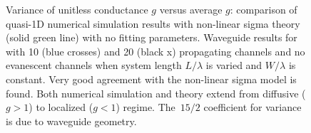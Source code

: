 \begin{figure}
\vskip -0.5cm
\centerline{
}
\vskip -0.5cm
\caption[Variance of unitless conductance $g$ versus average $g$: comparison of quasi-1D numerical simulation results with non-linear sigma theory~\cite{2000_Mirlin} (solid green line) with no fitting parameters.]{Variance of unitless conductance $g$ versus average $g$: comparison of quasi-1D numerical simulation results with non-linear sigma theory~\cite{2000_Mirlin} (solid green line) with no fitting parameters. Waveguide results for with 10 (blue crosses) and 20 (black x) propagating channels and no evanescent channels when system length $L/\lambda$ is varied and $W/\lambda$ is constant. Very good agreement with the non-linear sigma model is found. Both numerical simulation and theory extend from diffusive ($g>1$) to localized ($g<1$) regime. The~$15/2$ coefficient for variance is due to waveguide geometry.}
\label{fig:vargversusg}
\end{figure}

